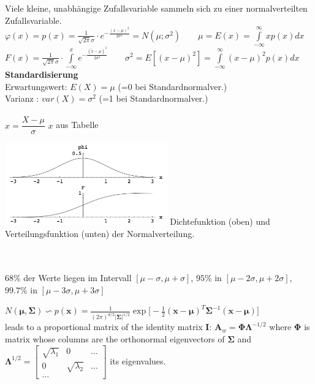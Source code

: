   \begin{minipage}{12cm}
  Viele kleine, unabhängige Zufallsvariable sammeln sich zu einer
  normalverteilten Zufallsvariable.\\
   $\varphi(x)=p(x)=\frac{1}{\sqrt{2
  \pi}\sigma}\cdot e^{-\frac{(x-\mu)^2}{2\sigma^2}} = N(\mu ; \sigma^2) \qquad \mu=E(x)=\int\limits_{-\infty}^{\infty}{x p(x) dx}$\\ 
  $F(x)=\frac{1}{\sqrt{2
  \pi}\sigma}\cdot \int\limits^{x}_{-\infty}{e^{-\frac{(\tilde{x} -\mu)^2}{2\sigma^2}}} \qquad \sigma^2=E\left[(x-\mu)^2\right]=\int\limits_{-\infty}^{\infty}{(x-\mu)^2 p(x) dx}$ \\
  \textbf{Standardisierung}\\
  Erwartungswert: $E(X)=\mu$ \hspace{4mm}(=0 bei Standardnormalver.)\\ 
  Varianz \hspace{11.5mm}: $var(X)=\sigma^2$ (=1 bei Standardnormalver.)\\ \\
  $x=\dfrac{X-\mu}{\sigma}$ \hspace{5mm} $x$ aus Tabelle
  \end{minipage}
  \begin{minipage}{7cm}
  \includegraphics[width=7cm]{images/normalverteilung.png}
  Dichtefunktion (oben) und Verteilungsfunktion (unten) der Normalverteilung. 
  \end{minipage} \\ \\ 
 $ 68\% $ der Werte liegen im Intervall $[ \mu - \sigma, \mu + \sigma]$, $95\% $ in $[ \mu - 2\sigma, \mu + 2\sigma]$, $99.7\% $ in $[ \mu - 3\sigma, \mu + 3\sigma]$



  $N(\boldsymbol{\mu}, \boldsymbol{\Sigma}) \backsim p(\mathbf{x}) = \frac{1}{(2\pi)^{d/2} | \boldsymbol{\Sigma}|^{1/2}} \exp \bigg[-\frac{1}{2} (\mathbf{x} - \boldsymbol{\mu})^T \boldsymbol{\Sigma}^{-1} (\mathbf{x}-\boldsymbol{\mu})\bigg]$
  \\
   leads to a proportional matrix of the identity matrix $\mathbf{I}$:
  $\mathbf{A}_w = \boldsymbol{\Phi} \boldsymbol{\Lambda}^{-1/2}$ 
  where $\mathbf{\Phi}$ is matrix whose columns are the orthonormal eigenvectors of 
  $\mathbf{\Sigma}$ and $\mathbf{\Lambda}^{1/2}=\begin{bmatrix}
  \sqrt{\lambda_1}& 0 & \ldots \\
  0&\sqrt{\lambda_2}&\ldots\\
  \ldots
  \end{bmatrix}$ its eigenvalues.
  

